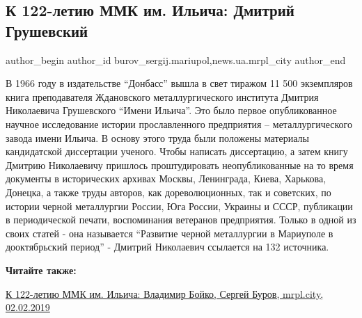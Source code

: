  
 
 
 
 
 
\subsection{К 122-летию ММК им. Ильича: Дмитрий Грушевский}
\label{sec:09_02_2019.stz.news.ua.mrpl_city.1.k_122_letiu_mmk_im_iljicha_dmitrii_grushevskii}
 
\ifcmt
 author_begin
   author_id burov_sergij.mariupol,news.ua.mrpl_city
 author_end
\fi

В 1966 году в издательстве \enquote{Донбасс} вышла в свет тиражом 11 500 экземпляров
книга преподавателя Ждановского металлургического института Дмитрия Николаевича
Грушевского \enquote{Имени Ильича}. Это было первое опубликованное научное исследование
истории прославленного предприятия – металлургического завода имени Ильича. В
основу этого труда были положены материалы кандидатской диссертации ученого.
Чтобы написать диссертацию, а затем книгу Дмитрию Николаевичу пришлось
проштудировать неопубликованные на то время документы в исторических архивах
Москвы, Ленинграда, Киева, Харькова, Донецка, а также труды авторов, как
дореволюционных, так и советских, по истории черной металлургии России, Юга
России, Украины и СССР, публикации в периодической печати, воспоминания
ветеранов предприятия. Только в одной из своих статей - она называется
\enquote{Развитие черной металлургии в Мариуполе в дооктябрьский период} - Дмитрий
Николаевич ссылается на 132 источника.

\vspace{0.5cm}
\begin{minipage}{0.9\textwidth}
\textbf{Читайте также:} 

\href{https://archive.org/details/02_02_2019.sergij_burov.mrpl_city.k_122_letiu_mkk_im_iljicha_vladimir_bojko}{%
К 122-летию ММК им. Ильича: Владимир Бойко, Сергей Буров, mrpl.city, 02.02.2019}
\end{minipage}
\vspace{0.5cm}

